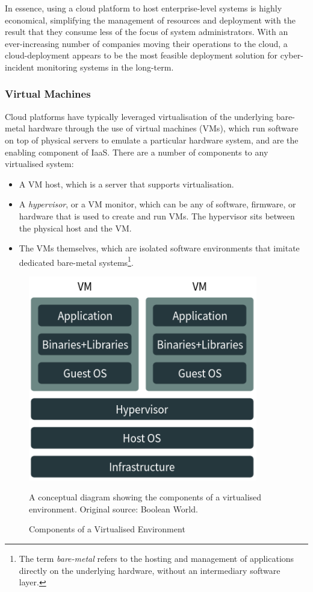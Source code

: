 In essence, using a cloud platform to host enterprise-level systems is highly economical, simplifying the management of resources and deployment with the result that they consume less of the focus of system administrators. With an ever-increasing number of companies moving their operations to the cloud, a cloud-deployment appears to be the most feasible deployment solution for cyber-incident monitoring systems in the long-term.

\subsubsection{Virtual Machines}
Cloud platforms have typically leveraged virtualisation of the underlying bare-metal hardware through the use of virtual machines (VMs), which run software on top of physical servers to emulate a particular hardware system, and are the enabling component of IaaS.  There are a number of components to any virtualised system:
\begin{itemize}
	\item A VM host, which is a server that supports virtualisation.
	\item A \textit{hypervisor}, or a VM monitor, which can be any of software, firmware, or hardware that is used to create and run VMs. The hypervisor sits between the physical host and the VM.
\item The VMs themselves, which are isolated software environments that imitate dedicated bare-metal systems\footnote{The term \textit{bare-metal} refers to the hosting and management of applications directly on the underlying hardware, without an intermediary software layer.}.
\end{itemize}

\begin{figure}[ht]
      \centering
      \includegraphics[width=100mm, scale=0.6]{Images/VM_Illustration.png}
      \caption{Components of a Virtualised Environment} 
      \medskip
	  \small
		A conceptual diagram showing the components of a virtualised environment. Original source: Boolean World. \cite{ContainerAndVMImageSource}
\label{fig:VMConceptualDiagram}
\end{figure}

